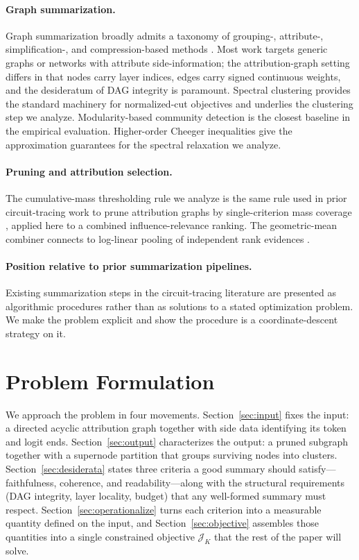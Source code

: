 \documentclass[table, 11pt]{article}
\begin{document}
\paragraph{Graph summarization.}
Graph summarization broadly admits a taxonomy of grouping-,
attribute-, simplification-, and compression-based methods
\cite{liu2018graph}. Most work targets generic graphs or networks
with attribute side-information; the attribution-graph setting differs
in that nodes carry layer indices, edges carry signed continuous
weights, and the desideratum of DAG integrity is paramount. Spectral
clustering \cite{shi2000normalized, von2007tutorial} provides the
standard machinery for normalized-cut objectives and underlies the
clustering step we analyze. Modularity-based community detection
\cite{newman2006modularity, clauset2004finding} is the closest baseline
in the empirical evaluation. Higher-order Cheeger inequalities
\cite{lee2014multiway, louis2012many} give the approximation
guarantees for the spectral relaxation we analyze.

\paragraph{Pruning and attribution selection.}
The cumulative-mass thresholding rule we analyze is the same rule
used in prior circuit-tracing work to prune attribution graphs by
single-criterion mass coverage \cite{ameisen2024scaling}, applied
here to a combined influence-relevance ranking. The geometric-mean
combiner connects to log-linear pooling of independent rank
evidences \cite{genest1986combining}.

\paragraph{Position relative to prior summarization pipelines.}
Existing summarization steps in the circuit-tracing literature are
presented as algorithmic procedures rather than as solutions to a
stated optimization problem. We make the problem explicit and show
the procedure is a coordinate-descent strategy on it.


\section{Problem Formulation}\label{sec:setup}

We approach the problem in four movements. Section~\ref{sec:input}
fixes the input: a directed acyclic attribution graph together with
side data identifying its token and logit ends. Section~\ref{sec:output}
characterizes the output: a pruned subgraph together with a
supernode partition that groups surviving nodes into clusters.
Section~\ref{sec:desiderata} states three criteria a good summary
should satisfy---faithfulness, coherence, and readability---along
with the structural requirements (DAG integrity, layer locality,
budget) that any well-formed summary must respect.
Section~\ref{sec:operationalize} turns each criterion into a
measurable quantity defined on the input, and
Section~\ref{sec:objective} assembles those quantities into a
single constrained objective $\mathcal{J}_K$ that the rest of the
paper will solve.
\end{document}
